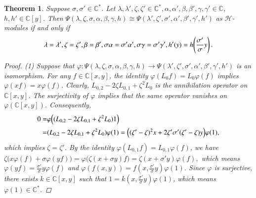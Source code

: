 \documentclass[12pt,reqno]{amsart}
\def\C{\mathbb{C}}
\numberwithin{equation}{section}
\newtheorem{theo}{Theorem}[section]
\begin{document}
\begin{theo}\label{th4.4}
    Suppose $\sigma,\sigma'\in\C^*$. Let
$\lambda,\lambda',\zeta,\zeta'\in\mathbb C^*,
\alpha,\alpha',\beta,\beta',\gamma,\gamma'\in\mathbb C$,
$h,h'\in\mathbb C[y]$.
Then
$\Psi(\lambda,\zeta,\sigma,\alpha,\beta,\gamma,h)
\cong
\Psi(\lambda',\zeta',\sigma',\alpha',\beta',\gamma',h')$
as $\mathcal H$-modules if and only if
\begin{equation*}
\aligned
\lambda=\lambda',\zeta=\zeta',\beta=\beta',
\sigma\alpha=\sigma'\alpha',
\sigma\gamma=\sigma'\gamma',
h'(y)=h\!\left(\frac{\sigma'}{\sigma}y\right).
\endaligned
\end{equation*}
\begin{proof}
\rm(1)   Suppose that $\varphi:\Psi(\lambda,\zeta,\sigma,\alpha,\beta,\gamma,h)
\rightarrow
\Psi(\lambda',\zeta',\sigma',\alpha',\beta',\gamma',h')$
 is an isomorphism. 
For any $f\in\C[x,y]$, the identity $\varphi(L_{0}f)=L_{0}\varphi(f)$ implies $\varphi(xf)=x\varphi(f)$. Clearly, $L_{0,2}-2\zeta L_{0,1}+\zeta^2L_{0}$ is the annihilation operator on $\C[x,y]$.
The surjectivity of $\varphi$ implies that the same operator vanishes on $\varphi(\C[x,y])$. Consequently,
\begin{equation*}
\aligned
0
=&\varphi\Big((L_{0,2}-2\zeta L_{0,1}+\zeta^2L_{0})1\Big)
\\=&(L_{0,2}-2\zeta L_{0,1}+\zeta^2L_{0})\varphi(1)
=\Big((\zeta'-\zeta)^2x
+2\zeta'\sigma'(\zeta'-\zeta)y\Big)\varphi(1),
\endaligned
\end{equation*}
which implies $\zeta=\zeta'$.
By the identity $\varphi(L_{0,1}f)=L_{0,1}\varphi(f)$, we have $\zeta\bigl(x\varphi(f)+\sigma\varphi(yf)\bigr)
=\varphi\bigl(\zeta(x+\sigma y)f\bigr)=\zeta(x+\sigma'y)\varphi(f),$
which means $\varphi(yf)=\frac{\sigma'}{\sigma}y\varphi(f)$ and $\varphi(f(x,y))
=f\!\left(x,\frac{\sigma'}{\sigma}y\right)\varphi(1)$.
Since $\varphi$ is surjective, there exists $k\in\mathbb C[x,y]$ such that
$1=k\!\left(x,\frac{\sigma'}{\sigma}y\right)\varphi(1)$,
which means $\varphi(1)\in\mathbb C^*$.


\end{proof}
\end{theo}
\end{document}
